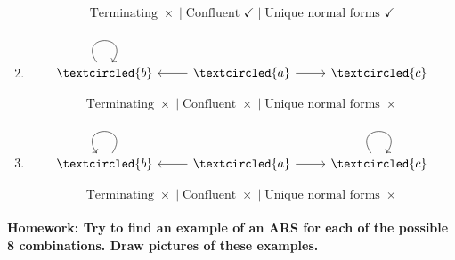 \documentclass{article}
\theoremstyle{theorem}
\theoremstyle{definition}
\theoremstyle{remark}
\begin{document}
\begin{enumerate}
\[
\text{Terminating } \times
\;\big|\;
\text{Confluent } \checkmark
\;\big|\;
\text{Unique normal forms } \checkmark
\]

    \item %
\[\begin{tikzcd}
	{\textcircled{b}} & {\textcircled{a}} & {\textcircled{c}}
	\arrow[from=1-1, to=1-1, loop, in=55, out=125, distance=10mm]
	\arrow[from=1-2, to=1-1]
	\arrow[from=1-2, to=1-3]
\end{tikzcd}\]

\[
\text{Terminating } \times
\;\big|\;
\text{Confluent } \times
\;\big|\;
\text{Unique normal forms } \times
\]

    \item %
\[\begin{tikzcd}
	{\textcircled{b}} & {\textcircled{a}} & {\textcircled{c}}
	\arrow[from=1-1, to=1-1, loop, in=125, out=55, distance=10mm]
	\arrow[from=1-2, to=1-1]
	\arrow[from=1-2, to=1-3]
	\arrow[from=1-3, to=1-3, loop, in=55, out=125, distance=10mm]
\end{tikzcd}\]

\[
\text{Terminating } \times
\;\big|\;
\text{Confluent } \times
\;\big|\;
\text{Unique normal forms } \times
\]

\end{enumerate}



\paragraph{Homework: Try to find an example of an ARS for each of the possible 8 combinations. Draw pictures of these examples.}
\end{document}
